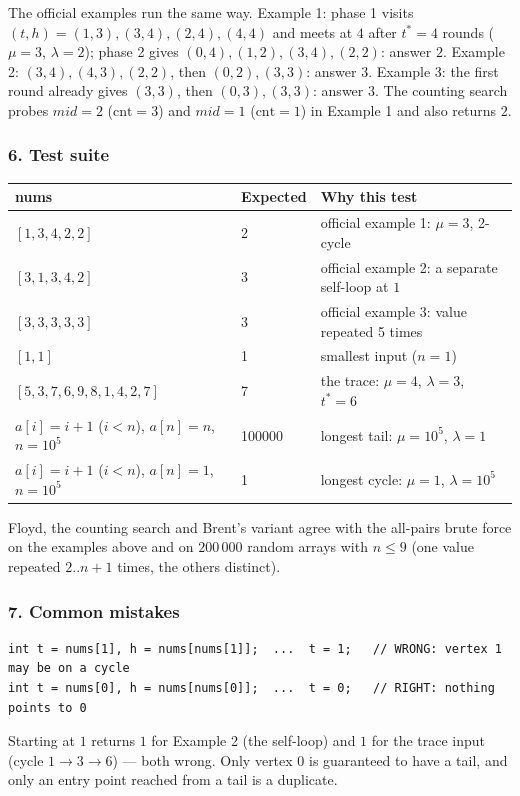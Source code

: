 The official examples run the same way. Example 1: phase 1 visits $(t,h) = (1,3), (3,4), (2,4), (4,4)$ and meets at $4$ after $t^\ast = 4$ rounds ($\mu = 3$, $\lambda = 2$); phase 2 gives $(0,4), (1,2), (3,4), (2,2)$: answer $2$. Example 2: $(3,4), (4,3), (2,2)$, then $(0,2), (3,3)$: answer $3$. Example 3: the first round already gives $(3,3)$, then $(0,3), (3,3)$: answer $3$. The counting search probes $\textit{mid} = 2$ ($\text{cnt} = 3$) and $\textit{mid} = 1$ ($\text{cnt} = 1$) in Example 1 and also returns $2$.

\subsubsection*{6. Test suite}

\begin{testbox}
\centering\small
\begin{tabular}{@{}lll@{}}
\toprule
\textbf{nums} & \textbf{Expected} & \textbf{Why this test} \\
\midrule
$[1,3,4,2,2]$ & 2 & official example 1: $\mu = 3$, 2-cycle \\
$[3,1,3,4,2]$ & 3 & official example 2: a separate self-loop at $1$ \\
$[3,3,3,3,3]$ & 3 & official example 3: value repeated 5 times \\
$[1,1]$ & 1 & smallest input ($n = 1$) \\
$[5,3,7,6,9,8,1,4,2,7]$ & 7 & the trace: $\mu = 4$, $\lambda = 3$, $t^\ast = 6$ \\
$a[i] = i+1$ ($i < n$), $a[n] = n$, $n = 10^5$ & 100000 & longest tail: $\mu = 10^5$, $\lambda = 1$ \\
$a[i] = i+1$ ($i < n$), $a[n] = 1$, $n = 10^5$ & 1 & longest cycle: $\mu = 1$, $\lambda = 10^5$ \\
\bottomrule
\end{tabular}
\end{testbox}

Floyd, the counting search and Brent's variant agree with the all-pairs brute force on the examples above and on $200\,000$ random arrays with $n \le 9$ (one value repeated $2..n+1$ times, the others distinct).

\subsubsection*{7. Common mistakes}

\begin{warningbox}
\begin{lstlisting}[style=snippet]
int t = nums[1], h = nums[nums[1]];  ...  t = 1;   // WRONG: vertex 1 may be on a cycle
int t = nums[0], h = nums[nums[0]];  ...  t = 0;   // RIGHT: nothing points to 0
\end{lstlisting}
Starting at $1$ returns $1$ for Example 2 (the self-loop) and $1$ for the trace input (cycle $1 \to 3 \to 6$) --- both wrong. Only vertex $0$ is guaranteed to have a tail, and only an entry point reached from a tail is a duplicate.
\end{warningbox}

